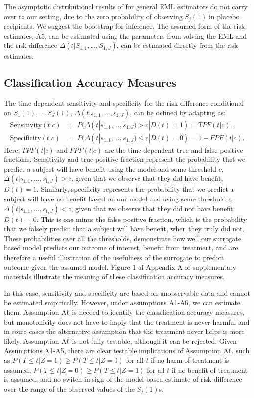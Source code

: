 \documentclass[times, doublespace]{simauth}
\begin{document}
The asymptotic distributional results of \citet{Pepe91} for general EML estimators do not carry over to our setting, due to the zero probability of observing $S_{j}(1)$ in placebo recipients. We suggest the bootstrap for inference. The assumed form of the risk estimates, A5, can be estimated using the parameters from solving the EML and the risk difference $\Delta(t|S_{1,1}, \dots, S_{1,J})$, can be estimated directly from the risk estimates. 

\subsection{Classification Accuracy Measures} \label{CAM}
The time-dependent sensitivity and specificity for the risk difference conditional on $S_{1}(1), \dots, S_{J}(1)$, $\Delta(t|s_{1,1}, \dots, s_{1,J})$, can be defined by adapting \citet{Heagerty00} as:
\begin{eqnarray*}
\mbox{Sensitivity}(t|c)&=&P(\Delta(t|s_{1,1}, \dots, s_{1,J}) > c|D(t)=1)=TPF(t|c),\\
\mbox{Specificity}(t|c)&=&P(\Delta(t|s_{1,1}, \dots, s_{1,J}) \leq c|D(t)=0)=1-FPF(t|c).
\end{eqnarray*}
Here, $TPF(t|c)$ and $FPF(t|c)$ are the time-dependent true and false positive fractions. Sensitivity and true positive fraction represent the probability that we predict a subject will have benefit using the model and some threshold $c$, $\Delta(t|s_{1,1}, \dots, s_{1,J}) > c$, given that we observe that they did have benefit, $D(t)=1$. Similarly, specificity represents the probability that we predict a subject will have no benefit based on our model and using some threshold $c$, $\Delta(t|s_{1,1}, \dots, s_{1,J}) < c$, given that we observe that they did not have benefit, $D(t)=0$. This is one minus the false positive fraction, which is the probability that we falsely predict that a subject will have benefit, when they truly did not. These probabilities over all the thresholds, demonstrate how well our surrogate based model predicts our outcome of interest, benefit from treatment, and are therefore a useful illustration of the usefulness of the surrogate to predict outcome given the assumed model. Figure 1 of Appendix A of supplementary materials illustrate the meaning of these classification accuracy measures. 

In this case, sensitivity and specificity are based on unobservable data and cannot be estimated empirically. However, under assumptions A1-A6, we can estimate them. Assumption A6 is needed to identify the classification accuracy measures, but monotonicity does not have to imply that the treatment is never harmful and in some cases the alternative assumption that the treatment never helps is more likely. Assumption A6 is not fully testable, although it can be rejected. Given Assumptions A1-A5, there are clear testable implications of Assumption A6, such as $P(T\leq t|Z=1)\geq P(T\leq t|Z=0)$ for all $t$ if no harm of treatment is assumed, $P(T \leq t|Z=0) \geq P(T\leq t|Z=1)$ for all $t$ if no benefit of treatment is assumed, and no switch in sign of the model-based estimate of risk difference over the range of the observed values of the $S_j(1)$s. 
\end{document}
